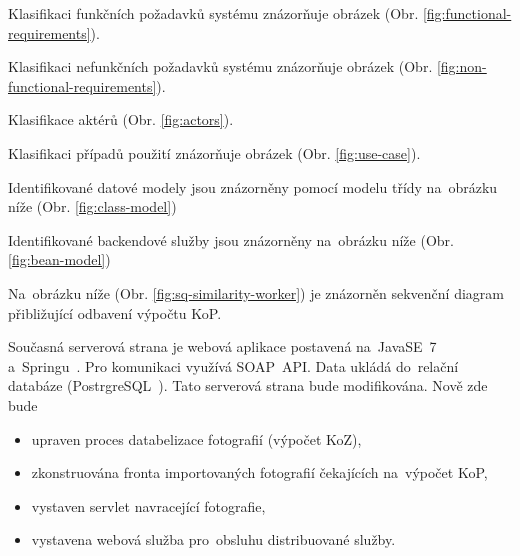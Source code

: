 


Klasifikaci funkčních požadavků systému znázorňuje obrázek (Obr. \ref{fig:functional-requirements}).

Klasifikaci nefunkčních požadavků systému znázorňuje obrázek (Obr. \ref{fig:non-functional-requirements}).



Klasifikace aktérů (Obr. \ref{fig:actors}).

Klasifikaci případů použití znázorňuje obrázek (Obr. \ref{fig:use-case}).



Identifikované datové modely jsou znázorněny pomocí modelu třídy na~obrázku níže (Obr. \ref{fig:class-model})

Identifikované backendové služby jsou znázorněny na~obrázku níže (Obr. \ref{fig:bean-model})


Na~obrázku níže (Obr. \ref{fig:sq-similarity-worker}) je znázorněn sekvenční diagram přibližující odbavení výpočtu KoP.



Současná serverová strana je webová aplikace postavená na~JavaSE~7~\cite{java-se} a~Springu~\cite{spring}. Pro komunikaci využívá SOAP~API. Data ukládá do~relační databáze (PostrgreSQL~\cite{postresql}). Tato serverová strana bude modifikována. Nově zde bude
\begin{itemize}
	\setlength{\parskip}{0pt}
	\setlength{\itemsep}{0pt}
	\item {upraven proces databelizace fotografií (výpočet KoZ),}
	\item {zkonstruována fronta importovaných fotografií čekajících na~výpočet KoP,}
	\item {vystaven servlet navracející fotografie,}
	\item {vystavena webová služba pro~obsluhu distribuované služby.}
\end{itemize}


